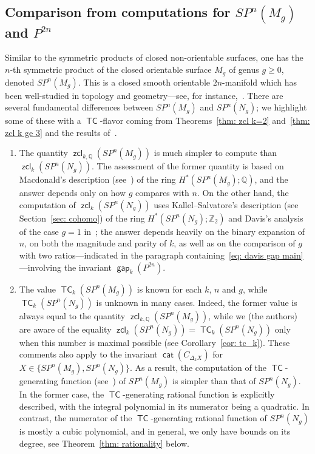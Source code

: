 \documentclass[amscd,amssymb,verbatim,10pt]{amsart}
\numberwithin{equation}{section}
\theoremstyle{plain}
\theoremstyle{definition}
\DeclareMathOperator{\cat}{{\mathsf{cat}}}
\DeclareMathOperator{\TC}{{\mathsf{TC}}}
\DeclareMathOperator{\zcl}{{\mathsf{zcl}}}
\DeclareMathOperator{\gap}{{\mathsf{gap}}}
\def\Z{{\mathbb Z}}
\def\Q{{\mathbb Q}}
\begin{document}
\subsection{Comparison from computations for $SP^n(M_g)$ and $P^{2n}$} 
Similar to the symmetric products of closed non-orientable surfaces, one has the $n$-th symmetric product of the closed orientable surface $M_g$ of genus $g\ge 0$, denoted $SP^n(M_g)$. This is a closed smooth orientable $2n$-manifold which has been well-studied in topology and geometry---see, for instance,~\cite{Mac,BGZ,KS,DCDJ}. There are several fundamental differences between $SP^n(M_g)$ and $SP^n(N_g)$; we highlight some of these with a $\TC$-flavor coming from Theorems~\ref{thm: zcl k=2} and~\ref{thm: zcl k ge 3} and the results of~\cite{Ja,DCDJ}.

\begin{enumerate}[(1)]
    \item The quantity $\zcl_{k,\Q}(SP^n(M_g))$ is much simpler to compute than $\zcl_k(SP^n(N_g))$. The assessment of the former quantity is based on Macdonald's description (see~\cite{Mac}) of the ring $H^*(SP^n(M_g);\Q)$, and the answer depends only on how $g$ compares with $n$. On the other hand, the computation of $\zcl_k(SP^n(N_g))$ uses Kallel--Salvatore's description (see Section~\ref{sec: cohomo}) of the ring $H^*(SP^n(N_g);\Z_2)$ and Davis's analysis of the case $g=1$ in~\cite{Dav}; the answer depends heavily on the binary expansion of $n$, on both the magnitude and parity of $k$, as well as on the comparison of $g$ with two ratios---indicated in the paragraph containing~\eqref{eq: davis gap main}---involving the invariant $\gap_k(P^{2n})$.

\item The value $\TC_{k}(SP^n(M_g))$ is known for each $k$, $n$ and $g$, while $\TC_k(SP^n(N_g))$ is unknown in many cases. Indeed, the former value is always equal to the quantity $\zcl_{k,\Q}(SP^n(M_g))$, while we (the authors) are aware of the equality $\zcl_k(SP^n(N_g))=\TC_k(SP^n(N_g))$ only when this number is maximal possible (see Corollary~\ref{cor: tc_k}). These comments also apply to the invariant $\cat(C_{\Delta_kX})$ for $X\in\{SP^n(M_g),SP^n(N_g)\}$. As a result, the computation of the $\TC$-generating function (see~\cite{FO,FKS}) of $SP^n(M_g)$ is simpler than that of $SP^n(N_g)$. In the former case, the $\TC$-generating rational function is explicitly described, with the integral polynomial in its numerator being a quadratic. In contrast, the numerator of the $\TC$-generating rational function of $SP^n(N_g)$ is mostly a cubic polynomial, and in general, we only have bounds on its degree, see Theorem~\ref{thm: rationality} below.
\end{enumerate}
\end{document}
